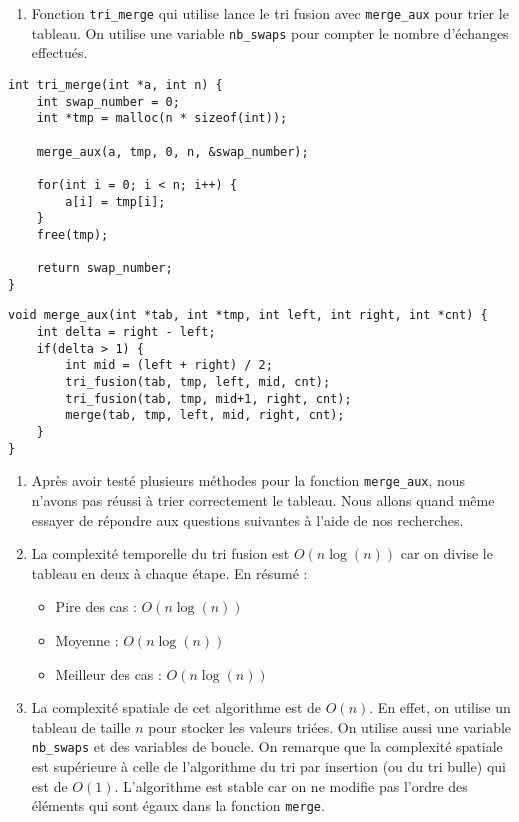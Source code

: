 \documentclass[12pt]{article}
\begin{document}
\begin{enumerate}[resume]
    \item Fonction \texttt{tri\_merge} qui utilise lance le tri fusion avec \texttt{merge\_aux} pour trier le tableau. On utilise une variable \texttt{nb\_swaps} pour compter le nombre d'échanges effectués.
\end{enumerate}

\begin{lstlisting}[style=languageClarge, caption=Implémentation de la fonction \texttt{tri\_merge}]
int tri_merge(int *a, int n) {
    int swap_number = 0;
    int *tmp = malloc(n * sizeof(int));

    merge_aux(a, tmp, 0, n, &swap_number);
    
    for(int i = 0; i < n; i++) {
        a[i] = tmp[i];
    }
    free(tmp);

    return swap_number;
}
\end{lstlisting}

\begin{lstlisting}[style=languageClarge, caption=Implémentation de la fonction \texttt{merge\_aux}]
void merge_aux(int *tab, int *tmp, int left, int right, int *cnt) {
    int delta = right - left;
    if(delta > 1) {
        int mid = (left + right) / 2;
        tri_fusion(tab, tmp, left, mid, cnt);
        tri_fusion(tab, tmp, mid+1, right, cnt);
        merge(tab, tmp, left, mid, right, cnt);
    }
}
\end{lstlisting}

\begin{enumerate}[resume]
    \item Après avoir testé plusieurs méthodes pour la fonction \texttt{merge\_aux}, nous n'avons pas réussi à trier correctement le tableau. Nous allons quand même essayer de répondre aux questions suivantes à l'aide de nos recherches.
    \item La complexité temporelle du tri fusion est $O(n\log(n))$ car on divise le tableau en deux à chaque étape. En résumé :
    \begin{itemize}
        \item Pire des cas : $O(n\log(n))$ 
        \item Moyenne : $O(n\log(n))$
        \item Meilleur des cas : $O(n\log(n))$
    \end{itemize}
    \item La complexité spatiale de cet algorithme est de $O(n)$. En effet, on utilise un tableau de taille $n$ pour stocker les valeurs triées. On utilise aussi une variable \texttt{nb\_swaps} et des variables de boucle. On remarque que la complexité spatiale est supérieure à celle de l'algorithme du tri par insertion (ou du tri bulle) qui est de $O(1)$. L'algorithme est stable car on ne modifie pas l'ordre des éléments qui sont égaux dans la fonction \texttt{merge}.
\end{enumerate}
\end{document}
